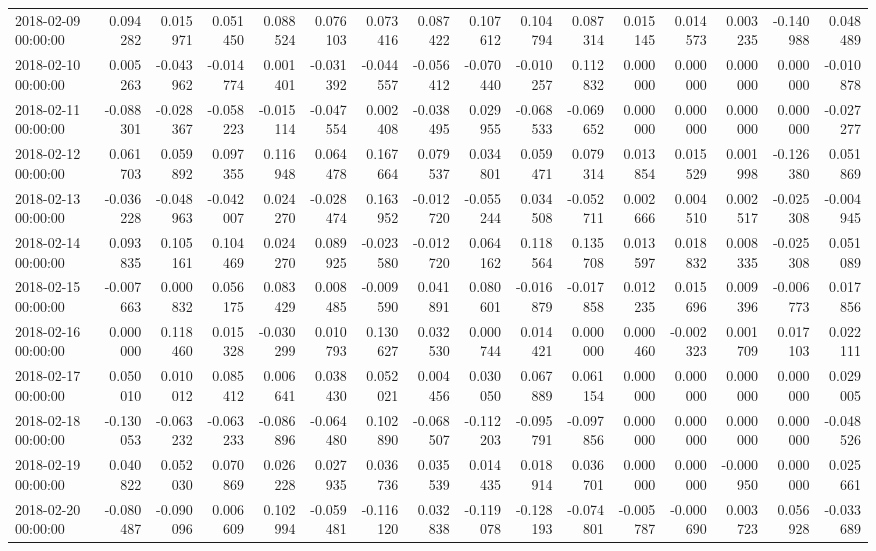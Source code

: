 \begin{tabular}{lrrrrrrrrrrrrrrr}
2018-02-09 00:00:00 & 0.094282 & 0.015971 & 0.051450 & 0.088524 & 0.076103 & 0.073416 & 0.087422 & 0.107612 & 0.104794 & 0.087314 & 0.015145 & 0.014573 & 0.003235 & -0.140988 & 0.048489 \\
2018-02-10 00:00:00 & 0.005263 & -0.043962 & -0.014774 & 0.001401 & -0.031392 & -0.044557 & -0.056412 & -0.070440 & -0.010257 & 0.112832 & 0.000000 & 0.000000 & 0.000000 & 0.000000 & -0.010878 \\
2018-02-11 00:00:00 & -0.088301 & -0.028367 & -0.058223 & -0.015114 & -0.047554 & 0.002408 & -0.038495 & 0.029955 & -0.068533 & -0.069652 & 0.000000 & 0.000000 & 0.000000 & 0.000000 & -0.027277 \\
2018-02-12 00:00:00 & 0.061703 & 0.059892 & 0.097355 & 0.116948 & 0.064478 & 0.167664 & 0.079537 & 0.034801 & 0.059471 & 0.079314 & 0.013854 & 0.015529 & 0.001998 & -0.126380 & 0.051869 \\
2018-02-13 00:00:00 & -0.036228 & -0.048963 & -0.042007 & 0.024270 & -0.028474 & 0.163952 & -0.012720 & -0.055244 & 0.034508 & -0.052711 & 0.002666 & 0.004510 & 0.002517 & -0.025308 & -0.004945 \\
2018-02-14 00:00:00 & 0.093835 & 0.105161 & 0.104469 & 0.024270 & 0.089925 & -0.023580 & -0.012720 & 0.064162 & 0.118564 & 0.135708 & 0.013597 & 0.018832 & 0.008335 & -0.025308 & 0.051089 \\
2018-02-15 00:00:00 & -0.007663 & 0.000832 & 0.056175 & 0.083429 & 0.008485 & -0.009590 & 0.041891 & 0.080601 & -0.016879 & -0.017858 & 0.012235 & 0.015696 & 0.009396 & -0.006773 & 0.017856 \\
2018-02-16 00:00:00 & 0.000000 & 0.118460 & 0.015328 & -0.030299 & 0.010793 & 0.130627 & 0.032530 & 0.000744 & 0.014421 & 0.000000 & 0.000460 & -0.002323 & 0.001709 & 0.017103 & 0.022111 \\
2018-02-17 00:00:00 & 0.050010 & 0.010012 & 0.085412 & 0.006641 & 0.038430 & 0.052021 & 0.004456 & 0.030050 & 0.067889 & 0.061154 & 0.000000 & 0.000000 & 0.000000 & 0.000000 & 0.029005 \\
2018-02-18 00:00:00 & -0.130053 & -0.063232 & -0.063233 & -0.086896 & -0.064480 & 0.102890 & -0.068507 & -0.112203 & -0.095791 & -0.097856 & 0.000000 & 0.000000 & 0.000000 & 0.000000 & -0.048526 \\
2018-02-19 00:00:00 & 0.040822 & 0.052030 & 0.070869 & 0.026228 & 0.027935 & 0.036736 & 0.035539 & 0.014435 & 0.018914 & 0.036701 & 0.000000 & 0.000000 & -0.000950 & 0.000000 & 0.025661 \\
2018-02-20 00:00:00 & -0.080487 & -0.090096 & 0.006609 & 0.102994 & -0.059481 & -0.116120 & 0.032838 & -0.119078 & -0.128193 & -0.074801 & -0.005787 & -0.000690 & 0.003723 & 0.056928 & -0.033689 \\

\end{tabular}
